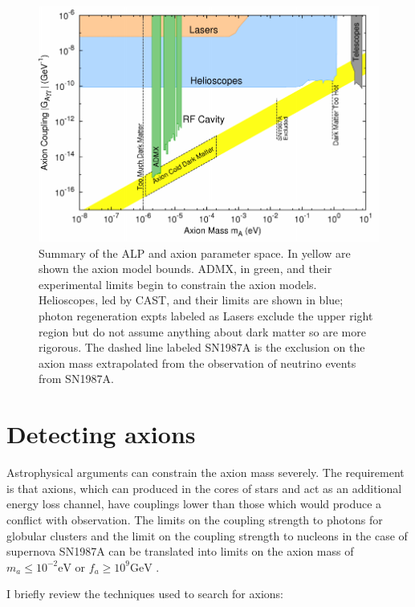 \documentclass[12pt,twosides]{book}
\begin{document}
\begin{figure}
\centering
\includegraphics[width=\textwidth]{2dexclusionplot}
\caption{Summary of the ALP and axion parameter space. In yellow are shown the axion model bounds. ADMX, in green, and their experimental limits begin to constrain the axion models. Helioscopes, led by CAST, and their limits are shown in blue; photon regeneration expts labeled as Lasers exclude the upper right region but do not assume anything about dark matter so are more rigorous. The dashed line labeled SN1987A is the exclusion on the axion mass extrapolated from the observation of neutrino events from SN1987A.}
\end{figure}

\section{Detecting axions}

Astrophysical arguments can constrain the axion mass severely. The requirement is that axions, which can produced in the cores of stars and act as an additional energy loss channel, have couplings lower than those which would produce a conflict with observation. The limits on the coupling strength to photons for globular clusters and the limit on the coupling strength to nucleons in the case of supernova SN1987A can be translated into limits on the axion mass of $m_a \leq 10^{-2} \text{eV}$ or $f_a \geq 10^9\text{GeV}$ \cite{raffelt08}.

I briefly review the techniques used to search for axions:
\end{document}
